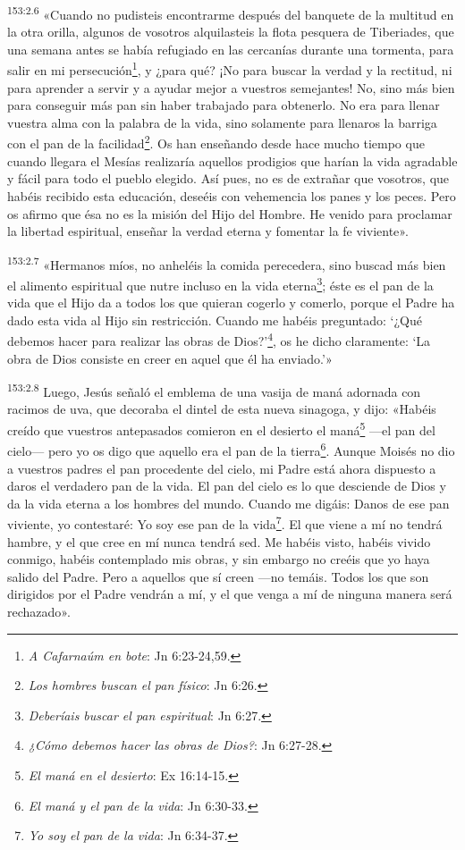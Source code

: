 \par 
\textsuperscript{153:2.6} «Cuando no pudisteis encontrarme después del banquete de la multitud en la otra orilla, algunos de vosotros alquilasteis la flota pesquera de Tiberiades, que una semana antes se había refugiado en las cercanías durante una tormenta, para salir en mi persecución\footnote{\textit{A Cafarnaúm en bote}: Jn 6:23-24,59.}, y ¿para qué? ¡No para buscar la verdad y la rectitud, ni para aprender a servir y a ayudar mejor a vuestros semejantes! No, sino más bien para conseguir más pan sin haber trabajado para obtenerlo. No era para llenar vuestra alma con la palabra de la vida, sino solamente para llenaros la barriga con el pan de la facilidad\footnote{\textit{Los hombres buscan el pan físico}: Jn 6:26.}. Os han enseñando desde hace mucho tiempo que cuando llegara el Mesías realizaría aquellos prodigios que harían la vida agradable y fácil para todo el pueblo elegido. Así pues, no es de extrañar que vosotros, que habéis recibido esta educación, deseéis con vehemencia los panes y los peces. Pero os afirmo que ésa no es la misión del Hijo del Hombre. He venido para proclamar la libertad espiritual, enseñar la verdad eterna y fomentar la fe viviente».

\par 
\textsuperscript{153:2.7} «Hermanos míos, no anheléis la comida perecedera, sino buscad más bien el alimento espiritual que nutre incluso en la vida eterna\footnote{\textit{Deberíais buscar el pan espiritual}: Jn 6:27.}; éste es el pan de la vida que el Hijo da a todos los que quieran cogerlo y comerlo, porque el Padre ha dado esta vida al Hijo sin restricción. Cuando me habéis preguntado: `¿Qué debemos hacer para realizar las obras de Dios?'\footnote{\textit{¿Cómo debemos hacer las obras de Dios?}: Jn 6:27-28.}, os he dicho claramente: `La obra de Dios consiste en creer en aquel que él ha enviado.'»

\par 
\textsuperscript{153:2.8} Luego, Jesús señaló el emblema de una vasija de maná adornada con racimos de uva, que decoraba el dintel de esta nueva sinagoga, y dijo: «Habéis creído que vuestros antepasados comieron en el desierto el maná\footnote{\textit{El maná en el desierto}: Ex 16:14-15.} ---el pan del cielo--- pero yo os digo que aquello era el pan de la tierra\footnote{\textit{El maná y el pan de la vida}: Jn 6:30-33.}. Aunque Moisés no dio a vuestros padres el pan procedente del cielo, mi Padre está ahora dispuesto a daros el verdadero pan de la vida. El pan del cielo es lo que desciende de Dios y da la vida eterna a los hombres del mundo. Cuando me digáis: Danos de ese pan viviente, yo contestaré: Yo soy ese pan de la vida\footnote{\textit{Yo soy el pan de la vida}: Jn 6:34-37.}. El que viene a mí no tendrá hambre, y el que cree en mí nunca tendrá sed. Me habéis visto, habéis vivido conmigo, habéis contemplado mis obras, y sin embargo no creéis que yo haya salido del Padre. Pero a aquellos que sí creen ---no temáis. Todos los que son dirigidos por el Padre vendrán a mí, y el que venga a mí de ninguna manera será rechazado».

